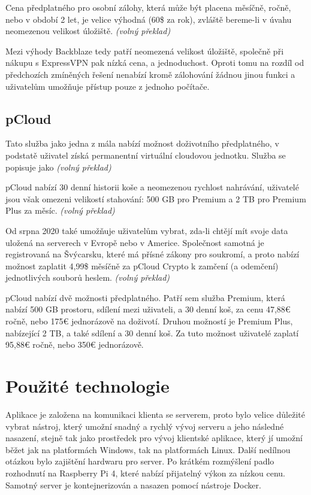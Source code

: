 \documentclass[
  glossaries,
]{kidiplom}
\begin{document}
Cena předplatného pro osobní zálohy, která může být placena měsíčně, ročně, nebo v období 2 let, je velice výhodná (60\$ za rok), zvláště bereme-li v úvahu neomezenou velikost úložiště. \cite{CLOUDSOLUTIONS} \textit {(volný překlad)}

Mezi výhody Backblaze tedy patří neomezená velikost úložiště, společně při nákupu s ExpressVPN pak nízká cena, a jednoduchost. Oproti tomu na rozdíl od předchozích zmíněných řešení nenabízí kromě zálohování žádnou jinou funkci a uživatelům umožňuje přístup pouze z jednoho počítače. \cite{CLOUDSOLUTIONS}

\subsection{pCloud}
Tato služba jako jedna z mála nabízí možnost doživotního předplatného, v podstatě uživatel získá permanentní virtuální cloudovou jednotku. Služba se popisuje jako  \cite{CLOUDSOLUTIONS} \textit {(volný překlad)}


pCloud nabízí 30 denní historii koše a neomezenou rychlost nahrávání, uživatelé jsou však omezeni velikostí stahování: 500 GB pro Premium a 2 TB pro Premium Plus za měsíc. \cite{CLOUDSOLUTIONS} \textit {(volný překlad)}

Od srpna 2020 také umožňuje uživatelům vybrat, zda-li chtějí mít svoje data uložená na serverech v Evropě nebo v Americe. Společnost samotná je registrovaná na Švýcarsku, které má přísné zákony pro soukromí, a proto nabízí možnost zaplatit 4,99\$ měsíčně za pCloud Crypto k zamčení (a odemčení) jednotlivých souborů heslem. \cite{CLOUDSOLUTIONS} \textit {(volný překlad)}

pCloud nabízí dvě možnosti předplatného. Patří sem služba Premium, která nabízí 500 GB prostoru, sdílení mezi uživateli, a 30 denní koš, za cenu 47,88€ ročně, nebo 175€ jednorázově na doživotí. Druhou možností je Premium Plus, nabízející 2 TB, a také sdílení a 30 denní koš. Za tuto možnost uživatelé zaplatí 95,88€ ročně, nebo 350€ jednorázově. \cite{PCLOUD}

\clearpage
\section{Použité technologie}
Aplikace je založena na komunikaci klienta se serverem, proto bylo velice důležité vybrat nástroj, který umožní snadný a rychlý vývoj serveru a jeho následné nasazení, stejně tak jako prostředek pro vývoj klientské aplikace, který jí umožní běžet jak na platformách Windows, tak na platformách Linux. Další nedílnou otázkou bylo zajištění hardwaru pro server. Po krátkém rozmýšlení padlo rozhodnutí na Raspberry Pi 4, které nabízí přijatelný výkon za nízkou cenu. Samotný server je kontejnerizován a nasazen pomocí nástroje Docker.
\end{document}
